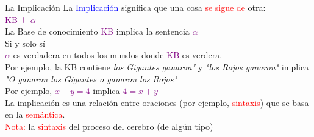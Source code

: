 \begin{frame}{La Implicación}
La \textcolor{blue}{Implicación} significa que una cosa
\textcolor{red}{se sigue de} otra:\\
\textcolor{purple}{KB $\models \alpha$ }\\
La Base de conocimiento \textcolor{purple}{KB} implica la sentencia \textcolor{purple}{ $\alpha$ } \\ 
\hspace{1cm} Si y solo sí \\
\textcolor{purple}{$\alpha$} es verdadera en todos los mundos donde \textcolor{purple}{KB} es verdera. \\
\vspace{0.1cm} Por ejemplo, la KB contiene \textit{los Gigantes ganaron"} y \textit{"los Rojos ganaron"} implica  \textit{"O ganaron los Gigantes o ganaron los Rojos" }\\ 
\vspace{0.1cm}
Por ejemplo, \textcolor{purple}{$x + y =4$} implica \textcolor{purple}{$4=x + y$}\\
\vspace{0.1cm}
La implicación es una relación entre oraciones (por ejemplo, \textcolor{red}{sintaxis}) que se basa en la \textcolor{red}{semántica}. \\
\vspace{0.8cm} \textcolor{red}{Nota:} la \textcolor{red}{sintaxis} del proceso del cerebro (de algún tipo)
\end{frame}